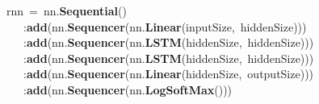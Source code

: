 \noindent
\mbox{}rnn\ =\ nn.\textbf{Sequential}() \\
\mbox{}\ \ \ :\textbf{add}(nn.\textbf{Sequencer}(nn.\textbf{Linear}(inputSize,\ hiddenSize))) \\
\mbox{}\ \ \ :\textbf{add}(nn.\textbf{Sequencer}(nn.\textbf{LSTM}(hiddenSize,\ hiddenSize))) \\
\mbox{}\ \ \ :\textbf{add}(nn.\textbf{Sequencer}(nn.\textbf{LSTM}(hiddenSize,\ hiddenSize))) \\
\mbox{}\ \ \ :\textbf{add}(nn.\textbf{Sequencer}(nn.\textbf{Linear}(hiddenSize,\ outputSize))) \\
\mbox{}\ \ \ :\textbf{add}(nn.\textbf{Sequencer}(nn.\textbf{LogSoftMax}()))
